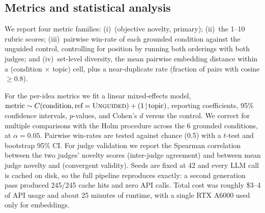 \subsection{Metrics and statistical analysis}

We report four metric families: (i)~\lgn (objective novelty, primary); (ii)~the 1--10 rubric scores; (iii)~pairwise win-rate of each grounded condition against the unguided control, controlling for position by running both orderings with both judges; and (iv)~set-level diversity, the mean pairwise embedding distance within a (condition $\times$ topic) cell, plus a near-duplicate rate (fraction of pairs with cosine $\geq 0.8$).

For the per-idea metrics we fit a linear mixed-effects model, $\text{metric} \sim C(\text{condition}, \text{ref}=\textsc{Unguided}) + (1\,|\,\text{topic})$, reporting coefficients, 95\% confidence intervals, $p$-values, and Cohen's $d$ versus the control. We correct for multiple comparisons with the Holm procedure across the 6 grounded conditions, at $\alpha = 0.05$. Pairwise win-rates are tested against chance (0.5) with a $t$-test and bootstrap 95\% CI. For judge validation we report the Spearman correlation between the two judges' novelty scores (inter-judge agreement) and between mean judge novelty and \lgn (convergent validity). Seeds are fixed at 42 and every LLM call is cached on disk, so the full pipeline reproduces exactly: a second generation pass produced 245/245 cache hits and zero API calls. Total cost was roughly \$3--4 of API usage and about 25 minutes of runtime, with a single RTX A6000 used only for embeddings.
